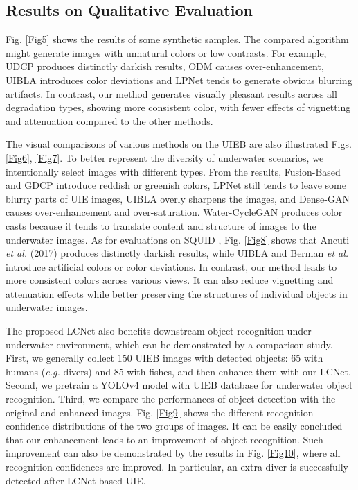 \documentclass[journal]{IEEEtran}
\begin{document}
\subsection{Results on Qualitative Evaluation}
 Fig. \ref{Fig5} shows the results of some synthetic samples.
 The compared algorithm might generate images with unnatural
colors or low contrasts. For example, UDCP \cite{UDCP} produces distinctly darkish results, ODM \cite{Histogram-prior} causes over-enhancement, UIBLA \cite{blurriness-based} introduces color deviations and LPNet \cite{fu2019lightweight} tends to generate obvious blurring artifacts. In contrast, our method generates visually pleasant results across all degradation types, showing more consistent color, with fewer effects of vignetting and attenuation compared to the other methods. 
 
The visual comparisons of various methods on the UIEB are also illustrated Figs. \ref{Fig6}, \ref{Fig7}. To better represent the diversity of underwater scenarios, we intentionally select images with different types. From the results, Fusion-Based \cite{fusion-based} and GDCP \cite{GDCP} introduce reddish or greenish colors, LPNet \cite{fu2019lightweight} still tends to leave some blurry parts of UIE images, UIBLA \cite{blurriness-based} overly sharpens the images, and Dense-GAN \cite{dense-gan} causes over-enhancement and over-saturation. Water-CycleGAN \cite{water-gan} produces color casts because it tends to translate content and structure of images to the underwater images. As for evaluations on SQUID \cite{berman2020underwater}, Fig. \ref{Fig8} shows that Ancuti \textit{et al.} (2017) \cite{ancuti2017color} produces distinctly darkish results, while UIBLA \cite{blurriness-based} and Berman \textit{et al.} \cite{berman2020underwater} introduce artificial colors or color deviations. In contrast, our method leads to more consistent colors across various views. It can also reduce vignetting and attenuation effects while better preserving the structures of individual objects in underwater images.

The proposed LCNet also benefits downstream object recognition under underwater environment, which can be demonstrated by a comparison study. First, we generally collect 150 UIEB images with detected objects: 65 with humans (\textit{e.g.} divers) and 85 with fishes, and then enhance them with our LCNet. Second, we pretrain a YOLOv4 \cite{bochkovskiy2020yolov4} model with UIEB database \cite{water-net} for underwater object recognition. Third, we compare the performances of object detection with the original and enhanced images. Fig. \ref{Fig9} shows the different recognition confidence distributions of the two groups of images. It can be easily concluded that our enhancement leads to an improvement of object recognition. Such improvement can also be demonstrated by the results in Fig. \ref{Fig10}, where all recognition confidences are improved. In particular, an extra diver is successfully detected after LCNet-based UIE.
\end{document}
